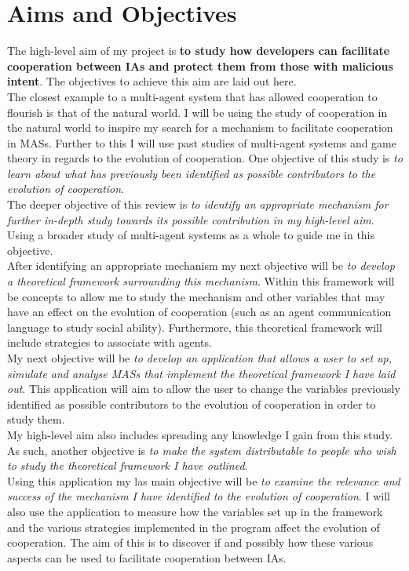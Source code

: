 \documentclass[]{final_report}
\begin{document}
\section{Aims and Objectives}
The high-level aim of my project is \textbf{to study how developers can facilitate cooperation between IAs and protect them from those with malicious intent}. The objectives to achieve this aim are laid out here.\\
The closest example to a multi-agent system that has allowed cooperation to flourish is that of the natural world. I will be using the study of cooperation in the natural world to inspire my search for a mechanism to facilitate cooperation in MASs. Further to this I will use past studies of multi-agent systems and game theory in regards to the evolution of cooperation. One objective of this study is \textit{to learn about what has previously been identified as possible contributors to the evolution of cooperation}.\\
The deeper objective of this review is \textit{to identify an appropriate mechanism for further in-depth study towards its possible contribution in my high-level aim}. Using a broader study of multi-agent systems as a whole to guide me in this objective.\\
After identifying an appropriate mechanism my next objective will be \textit{to develop a theoretical framework surrounding this mechanism}. Within this framework will be concepts to allow me to study the mechanism and other variables that may have an effect on the evolution of cooperation (such as an agent communication language to study social ability). Furthermore, this theoretical framework will include strategies to associate with agents.\\
My next objective will be \textit{to develop an application that allows a user to set up, simulate and analyse MASs that implement the theoretical framework I have laid out}. This application will aim to allow the user to change the variables previously identified as possible contributors to the evolution of cooperation in order to study them.\\
My high-level aim also includes spreading any knowledge I gain from this study. As such, another objective is \textit{to make the system distributable to people who wish to study the theoretical framework I have outlined}.\\
Using this application my las main objective will be \textit{to examine the relevance and success of the mechanism I have identified to the evolution of cooperation}. I will also use the application to measure how the variables set up in the framework and the various strategies implemented in the program affect the evolution of cooperation. The aim of this is to discover if and possibly how these various aspects can be used to facilitate cooperation between IAs.
\end{document}

